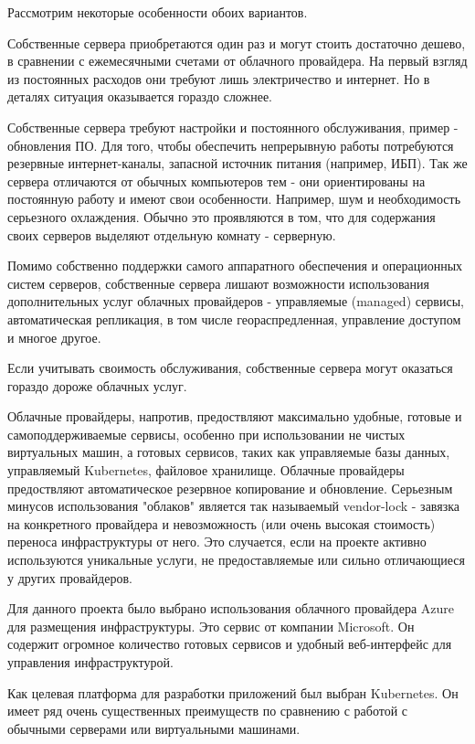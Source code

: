 Рассмотрим некоторые особенности обоих вариантов.

Собственные сервера приобретаются один раз и могут стоить достаточно дешево, в сравнении с ежемесячными счетами от облачного провайдера. На первый взгляд из постоянных расходов они требуют лишь электричество и интернет. Но в деталях ситуация оказывается гораздо сложнее.

Собственные сервера требуют настройки и постоянного обслуживания, пример - обновления ПО. Для того, чтобы обеспечить непрерывную работы потребуются резервные интернет-каналы, запасной источник питания (например, ИБП).
Так же сервера отличаются от обычных компьютеров тем - они ориентированы на постоянную работу и имеют свои особенности. Например, шум и необходимость серьезного охлаждения. Обычно это проявляются в том, что для содержания своих серверов выделяют отдельную комнату - серверную.

Помимо собственно поддержки самого аппаратного обеспечения и операционных систем серверов, собственные сервера лишают возможности использования дополнительных услуг облачных провайдеров - управляемые (managed) сервисы, автоматическая репликация, в том числе геораспредленная, управление доступом и многое другое.

Если учитывать своимость обслуживания, собственные сервера могут оказаться гораздо дороже облачных услуг.

Облачные провайдеры, напротив, предоствляют максимально удобные, готовые и самоподдерживаемые сервисы, особенно при использовании не чистых виртуальных машин, а готовых сервисов, таких как управляемые базы данных, управляемый Kubernetes, файловое хранилище. Облачные провайдеры предоствляют автоматическое резервное копирование и обновление. Серьезным минусов использования "облаков" является так называемый vendor-lock - завязка на конкретного провайдера и невозможность (или очень высокая стоимость) переноса инфраструктуры от него. Это случается, если на проекте активно используются уникальные услуги, не предоставляемые или сильно отличающиеся у других провайдеров.

Для данного проекта было выбрано использования облачного провайдера Azure для размещения инфраструктуры. Это сервис от компании Microsoft. Он содержит огромное количество готовых сервисов и удобный веб-интерфейс для управления инфраструктурой.

Как целевая платформа для разработки приложений был выбран Kubernetes. Он имеет ряд очень существенных преимуществ по сравнению с работой с обычными серверами или виртуальными машинами.

